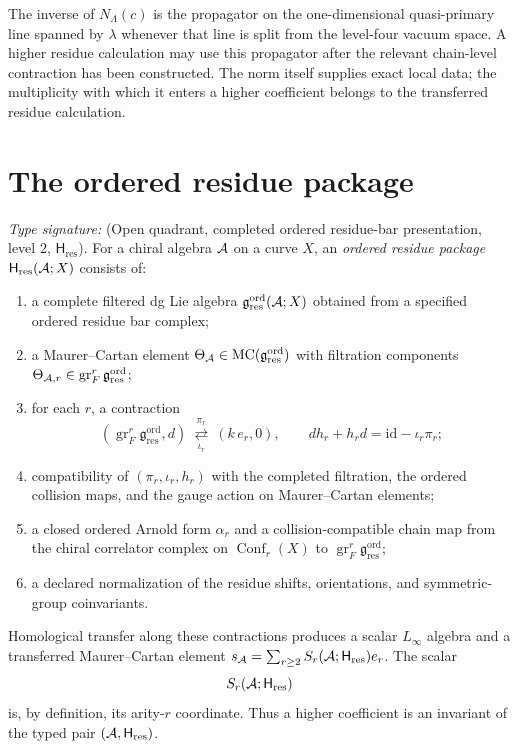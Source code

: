 \begin{remark}
\label{rem:sth-zamolodchikov-multiplicity}
The inverse of $N_\Lambda(c)$ is the propagator on the
one-dimensional quasi-primary line spanned by $\lambda$ whenever
that line is split from the level-four vacuum space.  A higher
residue calculation may use this propagator after the relevant
chain-level contraction has been constructed.  The norm itself
supplies exact local data; the multiplicity with which it enters a
higher coefficient belongs to the transferred residue calculation.
\end{remark}

\section{The ordered residue package}
\label{sec:sth-recurrence}

\begin{definition}
\ClaimStatusDefinitional
\label{def:shadow-transport-operator}
\emph{Type signature:}
\textup{(Open quadrant, completed ordered residue-bar presentation,
level \(2\), \(\mathsf H_{\mathrm{res}}\)).}
For a chiral algebra $\mathcal A$ on a curve $X$, an
\emph{ordered residue package}
$\mathsf H_{\mathrm{res}}(\mathcal A;X)$ consists of:

\begin{enumerate}[label=\textup{(R\arabic*)}]
\item a complete filtered dg Lie algebra
$\mathfrak g_{\mathrm{res}}^{\mathrm{ord}}(\mathcal A;X)$ obtained from a
specified ordered residue bar complex;
\item a Maurer--Cartan element
$\Theta_\mathcal A\in\mathrm{MC}(\mathfrak g_{\mathrm{res}}^{\mathrm{ord}})$ with
filtration components
$\Theta_{\mathcal A,r}\in\operatorname{gr}^r_F\mathfrak g_{\mathrm{res}}^{\mathrm{ord}}$;
\item for each $r$, a contraction
\[
 \left(
 \operatorname{gr}^r_F\mathfrak g_{\mathrm{res}}^{\mathrm{ord}},d
 \right)
 \ \underset{\iota_r}{\overset{\pi_r}{\rightleftarrows}}\
 (k\,e_r,0),
 \qquad
 dh_r+h_rd=\mathrm{id}-\iota_r\pi_r;
\]
\item compatibility of $(\pi_r,\iota_r,h_r)$ with the completed
filtration, the ordered collision maps, and the gauge action on
Maurer--Cartan elements;
\item a closed ordered Arnold form \(\alpha_r\) and a
collision-compatible chain map from the chiral correlator complex on
\(\operatorname{Conf}_r(X)\) to
\(\operatorname{gr}^r_F\mathfrak g_{\mathrm{res}}^{\mathrm{ord}}\);
\item a declared normalization of the residue shifts, orientations,
and symmetric-group coinvariants.
\end{enumerate}

Homological transfer along these contractions produces a scalar
$L_\infty$ algebra and a transferred Maurer--Cartan element
$s_\mathcal A=\sum_{r\ge2}S_r(\mathcal A;\mathsf H_{\mathrm{res}})e_r$.
The scalar
\[
 S_r(\mathcal A;\mathsf H_{\mathrm{res}})
\]
is, by definition, its arity-$r$ coordinate.  Thus a higher
coefficient is an invariant of the typed pair
$(\mathcal A,\mathsf H_{\mathrm{res}})$.
\end{definition}

